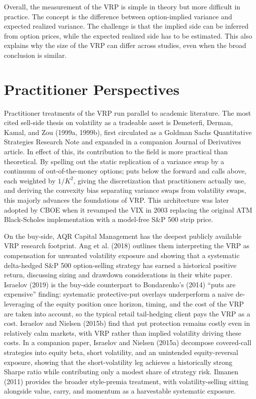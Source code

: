 \documentclass[11pt,a4paper]{article}
\begin{document}
Overall, the measurement of the VRP is simple in theory but more difficult in practice. The concept is the difference between option-implied variance and expected realized variance. The challenge is that the implied side can be inferred from option prices, while the expected realized side has to be estimated. This also explains why the size of the VRP can differ across studies, even when the broad conclusion is similar.

\section{Practitioner Perspectives}

Practitioner treatments of the VRP run parallel to academic literature. The most cited sell-side thesis on volatility as a tradeable asset is Demeterfi, Derman, Kamal, and Zou (1999a, 1999b), first circulated as a Goldman Sachs Quantitative Strategies Research Note and expanded in a companion Journal of Derivatives article. In effect of this, its contribution to the field is more practical than theoretical. By spelling out the static replication of a variance swap by a continuum of out-of-the-money options; puts below the forward and calls above, each weighted by \(1/K^{2}\), giving the discretization that practitioners actually use, and deriving the convexity bias separating variance swaps from volatility swaps, this majorly advances the foundations of VRP. This architecture was later adopted by CBOE when it revamped the VIX in 2003 replacing the original ATM Black-Scholes implementation with a model-free S\&P 500 strip price.

On the buy-side, AQR Capital Management has the deepest publicly available VRP research footprint. Ang et al. (2018) outlines them interpreting the VRP as compensation for unwanted volatility exposure and showing that a systematic delta-hedged S\&P 500 option-selling strategy has earned a historical positive return, discussing sizing and drawdown considerations in their white paper. Israelov (2019) is the buy-side counterpart to Bondarenko's (2014) ``puts are expensive'' finding: systematic protective-put overlays underperform a naive de-leveraging of the equity position once horizon, timing, and the cost of the VRP are taken into account, so the typical retail tail-hedging client pays the VRP as a cost. Israelov and Nielsen (2015b) find that put protection remains costly even in relatively calm markets, with VRP rather than implied volatility driving these costs. In a companion paper, Israelov and Nielsen (2015a) decompose covered-call strategies into equity beta, short volatility, and an unintended equity-reversal exposure, showing that the short-volatility leg achieves a historically strong Sharpe ratio while contributing only a modest share of strategy risk. Ilmanen (2011) provides the broader style-premia treatment, with volatility-selling sitting alongside value, carry, and momentum as a harvestable systematic exposure.
\end{document}
